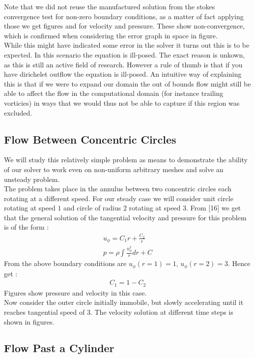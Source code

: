 \documentclass[11pt,twoside,a4paper]{article}
\begin{document}
Note that we did not reuse the manufactured solution from the stokes convergence test for non-zero boundary conditions, as a matter of fact applying those we get figures and  for velocity and pressure. These show non-convergence, which is confirmed when considering the error graph in space in figure.\\
While this might have indicated some error in the solver it turns out this is to be expected. In this scenario the equation is ill-posed. The exact reason is unkown, as this is still an active field of research. However a rule of thumb is that if you have dirichelet outflow the equation is ill-posed. An intuitive way of explaining this is that if we were to expand our domain the out of bounds flow might still be able to affect the flow in the computational domain (for instance trailing vorticies) in ways that we would thus not be able to capture if this region was excluded.

\subsection{Flow Between Concentric Circles}

We will study this relatively simple problem as means to demonstrate the ability of our solver to work even on non-uniform arbitrary meshes and solve an unsteady problem.\\
The problem takes place in the annulus between two concentric circles each rotating at a different speed. For our steady case we will consider unit circle rotating at speed $1$ and circle of radius $2$ rotating at speed $3$.
From [16] we get that the general solution of the tangential velocity and pressure for this problem is of the form :
\begin{align}
u_{\phi} = C_1 r + \frac{C_2}{r} \\
p = \rho \int \frac{u_{\phi}^2}{r} dr + C
\end{align}
From the above boundary conditions are $u_{\phi}(r=1) = 1$, $u_{\phi}(r=2) = 3$. Hence get :
\begin{align*}
C_1 = 1 - C_2
\end{align*}
Figures show pressure and velocity in this case.\\

Now consider the outer circle initially immobile, but slowly accelerating until it reaches tangential speed of $3$. The velocity solution at different time steps is shown in figures.

\subsection{Flow Past a Cylinder}
\end{document}
